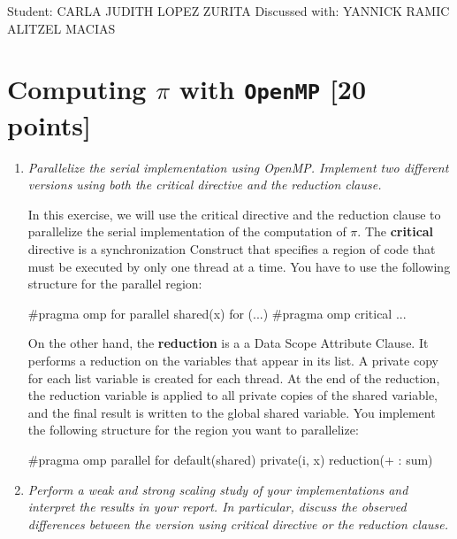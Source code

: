 \documentclass[unicode,11pt,a4paper,oneside,numbers=endperiod,openany]{scrartcl}
\begin{document}
\setassignment
{}

            {Student: CARLA JUDITH LOPEZ ZURITA}
            {Discussed with: YANNICK RAMIC \\
            \hspace*{370pt}ALITZEL MACIAS}
\newline

\assignmentpolicy

\section{Computing $\pi$ with \texttt{OpenMP} [20 points]}

\begin{enumerate}
    \item \textit{Parallelize the serial implementation using OpenMP. 
    Implement two different versions using both the critical directive and the
    reduction clause.}

    In this exercise, we will use the critical directive and the reduction
    clause to parallelize the serial implementation of the computation of $\pi$.
    The \textbf{critical} directive is a synchronization Construct that
    specifies a region of code that must be executed by only one thread at a
    time. \cite{hpc-tutorials-llnl-critical}
    You have to use the following structure for the parallel region:
    \begin{cppverbatim}
#pragma omp for parallel shared(x) 
for (...){
  #pragma omp critical 
  ...
}
    \end{cppverbatim}

    On the other hand, the \textbf{reduction} is a  a Data Scope Attribute
    Clause. It performs a reduction on the variables that appear in its list.
    A private copy for each list variable is created for each thread. At the end
    of the reduction, the reduction variable is applied to all private copies of
    the shared variable, and the final result is written to the global shared
    variable. \cite{hpc-tutorials-llnl-reduction}
    You implement the following structure for the region you want to parallelize:
    \begin{cppverbatim}
#pragma omp parallel for default(shared) private(i, x) reduction(+ : sum)
    \end{cppverbatim}

    \item \textit{Perform a weak and strong scaling study of your
    implementations and interpret the results in your report. 
    In particular, discuss the observed differences between the version using
    critical directive or the reduction clause.}


\end{enumerate}
\end{document}
